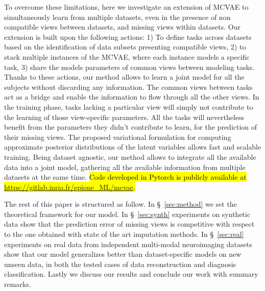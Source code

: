 To overcome these limitations, here we investigate an extension of MCVAE to simultaneously learn from multiple datasets, even in the presence of non compatible views between datasets, and missing views within datasets.
Our extension  is built upon the following actions:
1) To define tasks across datasets based on the identification of data subsets presenting compatible views,
2) to stack multiple instances of the MCVAE, where each instance models a specific task,
3) share the models parameters of common views between modeling tasks.
%
Thanks to these actions, our method allows to learn a joint model for all the subjects without discarding any information.
The common views between tasks act as a bridge and enable the information to flow through all the other views.
In the training phase, tasks lacking a particular view will simply not contribute to the learning of those view-specific parameters.
All the tasks will nevertheless benefit from the parameters they didn't contribute to learn, for the prediction of their missing views.
The proposed variational formulation for computing approximate posterior distributions of the latent variables allows fast and scalable training.
Being dataset agnostic, our method allows to integrate all the available data into a joint model, gathering  all the available information from multiple datasets at the same time.
\hl{Code developed in Pytorch \mbox{\citep{Paszke2019}} is publicly available at \mbox{\url{https://gitlab.inria.fr/epione\_ML/mcvae}}.}

The rest of this paper is structured as follow.
In \S~\ref{sec:method} we set the theoretical framework for our model.
In \S~\ref{sec:synth} experiments on synthetic data show that the prediction error of missing views is competitive with respect to the one obtained with state of the art imputation methods.
In \S~\ref{sec:real} experiments on real data from independent multi-modal neuroimaging datasets show that our model generalizes better than dataset-specific models on new unseen data, in both the tested cases of data reconstruction and diagnosis classification.
Lastly we discuss our results and conclude our work with summary remarks.
